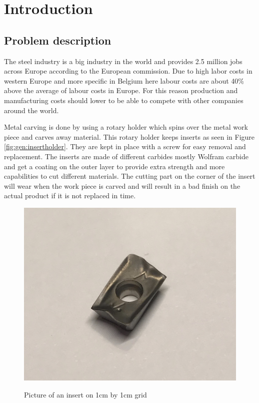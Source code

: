 
\chapter{Introduction}

\section{Problem description}

    The steel industry is a big industry in the world and provides 2.5 million jobs across Europe according to the European commission. Due to high labor costs in western Europe and more specific in Belgium here labour costs are about 40\% above the average of labour costs in Europe. For this reason production and manufacturing costs should lower to be able to compete with other companies around the world. 
    
Metal carving is done by using a rotary holder which spins over the metal work piece and carves away material. This rotary holder keeps inserts as seen in Figure \ref{fig:gen:insertholder}. They are kept in place with a screw for easy removal and replacement. The inserts are made of different carbides mostly Wolfram carbide and get a coating on the outer layer to provide extra strength and more capabilities to cut different materials. The cutting part on the corner of the insert will wear when the work piece is carved and will result in a bad finish on the actual product if it is not replaced in time. 
    
\begin{figure}[hbtp]
\centering
\includegraphics[scale=0.04]{fig/algemeen/plaatjes/plaatje/plaatje_top_corner.jpeg}
\label{fig:gen:insert1x1}
\caption{Picture of an insert on 1cm by 1cm grid}
\end{figure}

